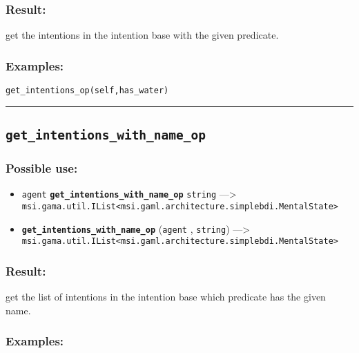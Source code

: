 \documentclass[]{book}
\providecommand{\tightlist}{%
  \setlength{\itemsep}{0pt}\setlength{\parskip}{0pt}}
\theoremstyle{definition}
\theoremstyle{definition}
\theoremstyle{definition}
\theoremstyle{remark}
\begin{document}
\subsubsection{Result:}\label{result-210}

get the intentions in the intention base with the given predicate.

\subsubsection{Examples:}\label{examples-163}

\begin{verbatim}
get_intentions_op(self,has_water) 
\end{verbatim}

\begin{center}\rule{0.5\linewidth}{\linethickness}\end{center}

\subsection{\texorpdfstring{\texttt{get\_intentions\_with\_name\_op}}{get\_intentions\_with\_name\_op}}\label{get_intentions_with_name_op}

\subsubsection{Possible use:}\label{possible-use-217}

\begin{itemize}
\tightlist
\item
  \texttt{agent} \textbf{\texttt{get\_intentions\_with\_name\_op}}
  \texttt{string} ---\textgreater{}
  \texttt{msi.gama.util.IList\textless{}msi.gaml.architecture.simplebdi.MentalState\textgreater{}}
\item
  \textbf{\texttt{get\_intentions\_with\_name\_op}} (\texttt{agent} ,
  \texttt{string}) ---\textgreater{}
  \texttt{msi.gama.util.IList\textless{}msi.gaml.architecture.simplebdi.MentalState\textgreater{}}
\end{itemize}

\subsubsection{Result:}\label{result-211}

get the list of intentions in the intention base which predicate has the
given name.

\subsubsection{Examples:}\label{examples-164}
\end{document}
